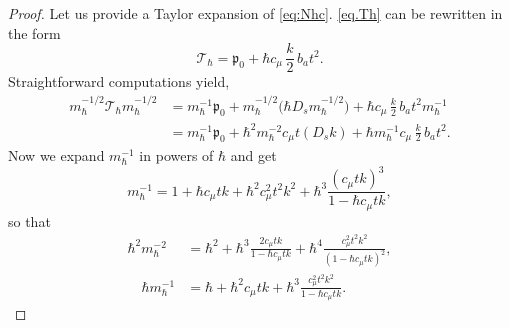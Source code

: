 \documentclass[JEP,XML,SOM,Unicode,NoFloatCountersInSection,published]{cedram}
\theoremstyle{plain}
\theoremstyle{definition}
\begin{document}
\begin{proof}
Let us provide a Taylor expansion of \eqref{eq:Nhc}. \eqref{eq.Th} can be rewritten in the form
\[
\mathcal T_{\hbar}= \mathfrak{p}_0+\hbar c_\mu\,\frac{k}{2}\,b_at^2.
\]
Straightforward computations yield,
\[
\begin{aligned}
m_\hbar^{-1/2}\mathcal T_{\hbar} m_\hbar^{-1/2}&=m_\hbar^{-1}\mathfrak p_0+m_\hbar^{-1/2}\bigl(\hbar D_s m_\hbar^{-1/2}\bigr)+\hbar c_\mu\,\frac{k}{2}\,b_at^2 m_\hbar^{-1}\\
&=m_\hbar^{-1}\mathfrak p_0+\hbar^2 m_\hbar^{-2} c_\mu t(D_sk)+\hbar m_\hbar^{-1}c_\mu\,\frac{k}{2}\,b_at^2 .
\end{aligned}
\]
Now we expand $m_\hbar^{-1}$ in powers of $\hbar$ and get
\[
m_\hbar^{-1}=1+\hbar c_\mu tk+\hbar^2c_\mu^2t^2k^2+\hbar^3\frac{(c_\mu t k)^3}{1-\hbar c_\mu t k},
\]
so that
\[
\begin{aligned}
\hbar^2m_\hbar^{-2}&=\hbar^2+\hbar^3\frac{2c_\mu tk}{1-\hbar c_\mu tk}+\hbar^4\frac{c_\mu^2t^2k^2}{(1-\hbar c_\mu tk)^2},\\
\quad
\hbar m_\hbar^{-1}&=\hbar+\hbar^2 c_\mu tk+\hbar^3\frac{c_\mu^2t^2k^2}{1-\hbar c_\mu t k}.
\end{aligned}
\]


\end{proof}
\end{document}
